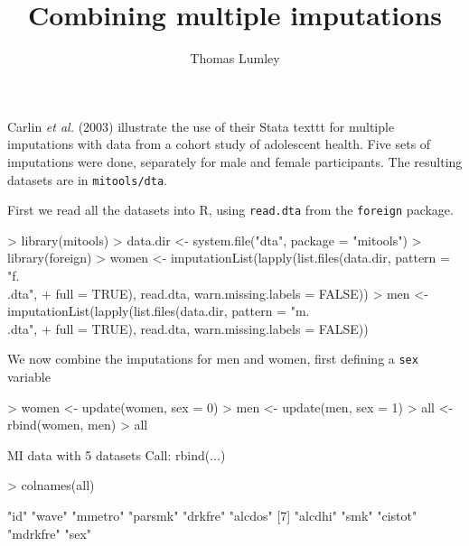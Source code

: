 \documentclass[12pt]{article}
\title{Combining multiple imputations}
\author{Thomas Lumley}
\begin{document}
\maketitle

Carlin \emph{et al.} (2003) illustrate the use of their Stata texttt for
multiple imputations with data from a cohort study of adolescent
health.  Five sets of imputations were done, separately for male and
female participants.  The resulting datasets are in \texttt{mitools/dta}.

First we read all the datasets into R, using \texttt{read.dta} from the \texttt{foreign} package.
\begin{Schunk}
\begin{Sinput}
> library(mitools)
> data.dir <- system.file("dta", package = "mitools")
> library(foreign)
> women <- imputationList(lapply(list.files(data.dir, pattern = "f.\\.dta", 
+     full = TRUE), read.dta, warn.missing.labels = FALSE))
> men <- imputationList(lapply(list.files(data.dir, pattern = "m.\\.dta", 
+     full = TRUE), read.dta, warn.missing.labels = FALSE))
\end{Sinput}
\end{Schunk}

We now combine the imputations for men and women, first defining a \texttt{sex} variable
\begin{Schunk}
\begin{Sinput}
> women <- update(women, sex = 0)
> men <- update(men, sex = 1)
> all <- rbind(women, men)
> all
\end{Sinput}
\begin{Soutput}
MI data with 5 datasets
Call: rbind(...)
\end{Soutput}
\begin{Sinput}
> colnames(all)
\end{Sinput}
\begin{Soutput}
 [1] "id"      "wave"    "mmetro"  "parsmk"  "drkfre"  "alcdos" 
 [7] "alcdhi"  "smk"     "cistot"  "mdrkfre" "sex"    
\end{Soutput}
\end{Schunk}
\end{document}
